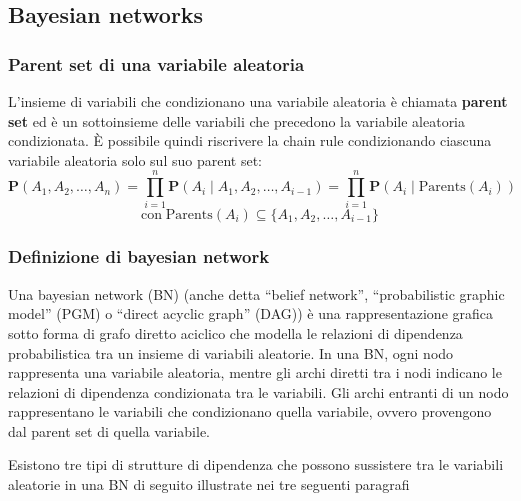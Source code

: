 \subsection{Bayesian networks}
\subsubsection*{Parent set di una variabile aleatoria}
L'insieme di variabili che condizionano una variabile aleatoria è chiamata \textbf{parent set} ed è un sottoinsieme
delle variabili che precedono la variabile aleatoria condizionata. È possibile quindi riscrivere la chain rule condizionando
ciascuna variabile aleatoria solo sul suo parent set:
\[\textbf{P}(A_1, A_2, \ldots, A_n) = \prod_{i=1}^{n} \textbf{P}(A_i \mid A_1, A_2, \ldots, A_{i-1}) = \prod_{i=1}^{n} \textbf{P}(A_i \mid \text{Parents}(A_i))\]
\[\text{con} \; \text{Parents}(A_i) \subseteq \{A_1, A_2, \ldots, A_{i-1}\}\]

\subsubsection*{Definizione di bayesian network}
Una bayesian network (BN) (anche detta  ``belief network'', ``probabilistic graphic model'' (PGM) o ``direct acyclic
graph'' (DAG)) è una rappresentazione grafica sotto forma di grafo diretto aciclico che modella le relazioni di dipendenza
probabilistica tra un insieme di variabili aleatorie. In una BN, ogni nodo rappresenta una variabile aleatoria, mentre gli
archi diretti tra i nodi indicano le relazioni di dipendenza condizionata tra le variabili. Gli archi entranti di un nodo
rappresentano le variabili che condizionano quella variabile, ovvero provengono dal parent set di quella variabile.

Esistono tre tipi di strutture di dipendenza che possono sussistere tra le variabili aleatorie in una BN di seguito
illustrate nei tre seguenti paragrafi

